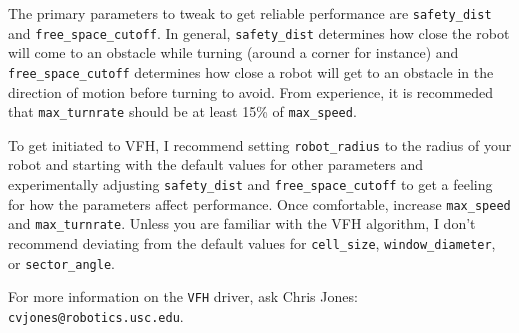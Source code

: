 The primary parameters to tweak to get reliable performance are {\tt safety\_dist} and {\tt free\_space\_cutoff}.  In general, {\tt safety\_dist} determines how close the robot will come to an obstacle while turning (around a corner for instance) and {\tt free\_space\_cutoff} determines how close a robot will get to an obstacle in the direction of motion before turning to avoid.  From experience, it is recommeded that {\tt max\_turnrate} should be at least 15\% of {\tt max\_speed}.

To get initiated to VFH, I recommend setting {\tt robot\_radius} to the radius of your robot and starting with the default values for other parameters and experimentally adjusting {\tt safety\_dist} and {\tt free\_space\_cutoff} to get a feeling for how the parameters affect performance.  Once comfortable, increase {\tt max\_speed} and {\tt max\_turnrate}.  Unless you are familiar with the VFH algorithm, I don't recommend deviating from the default values for {\tt cell\_size}, {\tt window\_diameter}, or {\tt sector\_angle}.

For more information on the {\tt VFH} driver, ask Chris Jones: {\tt cvjones@robotics.usc.edu}.

